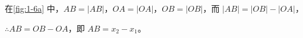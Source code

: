 \begin{figure}
  \begin{minipage}{0.1\linewidth}
    \subcaption{}\label{fig:1-6a}
  \end{minipage}%
  \begin{minipage}{0.7\linewidth}

  \end{minipage}\par
  \begin{minipage}{0.1\linewidth}
    \subcaption{}\label{fig:1-6b}
  \end{minipage}%
  \begin{minipage}{0.7\linewidth}

  \end{minipage}\par
  \begin{minipage}{0.1\linewidth}
    \subcaption{}\label{fig:1-6c}
  \end{minipage}%
  \begin{minipage}{0.7\linewidth}

  \end{minipage}\par
  \begin{minipage}{0.1\linewidth}
    \subcaption{}\label{fig:1-6d}
  \end{minipage}%
  \begin{minipage}{0.7\linewidth}

  \end{minipage}\par
  \begin{minipage}{0.1\linewidth}
    \subcaption{}\label{fig:1-6e}
  \end{minipage}%
  \begin{minipage}{0.7\linewidth}

  \end{minipage}\par
  \begin{minipage}{0.1\linewidth}
    \subcaption{}\label{fig:1-6f}
  \end{minipage}%
  \begin{minipage}{0.7\linewidth}

  \end{minipage}\par
  \caption{}\label{fig:1-6}
\end{figure}

在\cref{fig:1-6a} 中，$AB=|AB|$，$OA=|OA|$，$OB=|OB|$，而 $|AB|=|OB|-|OA|$，

$\therefore AB=OB-OA$，即 $AB=x_2-x_1$。

